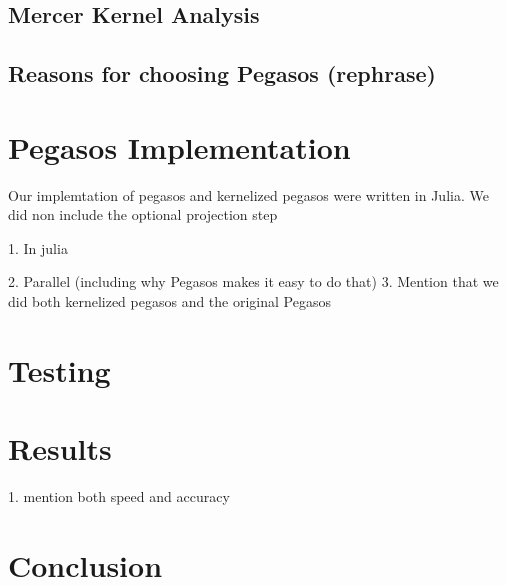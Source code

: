 \documentclass{article}
\begin{document}
\subsection{Mercer Kernel Analysis}

\subsection{Reasons for choosing Pegasos (rephrase)}
\section{Pegasos Implementation}

Our implemtation of pegasos and kernelized pegasos were written in Julia. We did non include the optional projection step

1. In julia

2. Parallel (including why Pegasos makes it easy to do that)
3. Mention that we did both kernelized pegasos and the original Pegasos



\section{Testing}


\section{Results}
1. mention both speed and accuracy

\section{Conclusion}
\end{document}
